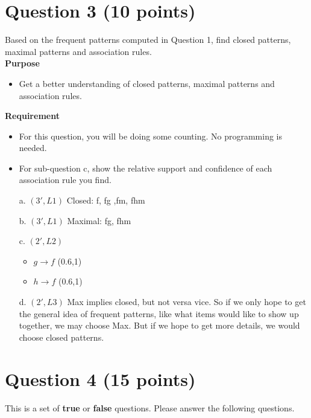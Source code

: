 \section*{Question 3 (10 points)}
Based on the frequent patterns computed in Question 1, find closed patterns, maximal patterns and association rules. \\ 

\textbf{Purpose}
\begin{itemize}
\item Get a better understanding of closed patterns, maximal patterns and association rules.
\end{itemize}

\textbf{Requirement}
\begin{itemize}
\item For this question, you will be doing some counting. No programming is needed.
\item For sub-question c, show the relative support and confidence of each association rule you find.
\end{itemize}

\begin{enumerate}
  \item[a.] $(3', L1)$ Closed: f, fg ,fm, fhm
  
  \item[b.] $(3', L1)$ Maximal: fg, fhm

  \item[c.] $(2', L2)$ 
  
  \begin{itemize}
  \item $g \to f$ (0.6,1)
  \item $h \to f$ (0.6,1)
  
  \end{itemize}
  
  \item[d.] $(2', L3)$ Max implies closed, but not versa vice. So if we only hope to get the general idea of frequent patterns, like what items would like to show up together, we may choose Max. But if we hope to get more details, we would choose closed patterns. 
  
  
\end{enumerate}


\section*{Question 4 (15 points)}
This is a set of \textbf{true} or \textbf{false} questions.  Please answer the following questions. \\ 

